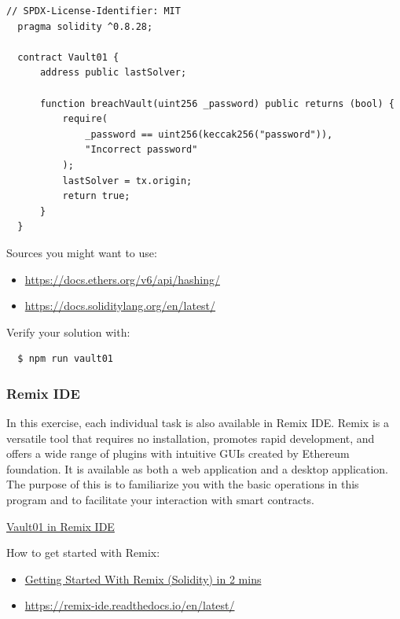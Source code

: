 \documentclass[12pt]{article}
\begin{document}
\begin{lstlisting}[language=Solidity]
  // SPDX-License-Identifier: MIT
  pragma solidity ^0.8.28;
  
  contract Vault01 {
      address public lastSolver;
  
      function breachVault(uint256 _password) public returns (bool) {
          require(
              _password == uint256(keccak256("password")),
              "Incorrect password"
          );
          lastSolver = tx.origin;
          return true;
      }
  }  
\end{lstlisting}

\medskip
\noindent
Sources you might want to use:
\begin{itemize}
  \item \href{https://docs.ethers.org/v6/api/hashing/}{https://docs.ethers.org/v6/api/hashing/}
  \item \href{https://docs.soliditylang.org/en/latest/}{https://docs.soliditylang.org/en/latest/}
\end{itemize}

\medskip
\noindent
Verify your solution with:
\begin{verbatim}
  $ npm run vault01
\end{verbatim}

\subsubsection*{Remix IDE}

In this exercise, each individual task is also available in Remix IDE. Remix is a versatile tool that requires no installation, promotes rapid development, and offers a wide range of plugins with intuitive GUIs created by Ethereum foundation. It is available as both a web application and a desktop application. The purpose of this is to familiarize you with the basic operations in this program and to facilitate your interaction with smart contracts.

\medskip
\noindent
\href{https://remix.ethereum.org/?#activate=solidity&url=https://github.com/radovluk/unbreakable-vault/contracts/Vault01.sol&lang=en&optimize=false&runs=200&evmVersion=null&version=soljson-v0.8.28+commit.7893614a.js}{Vault01 in Remix IDE}

\medskip
\noindent
How to get started with Remix:
\begin{itemize}
  \item \href{https://www.youtube.com/watch?v=vH8T3In6ZkE&t=7s&ab_channel=EatTheBlocks}{Getting Started With Remix (Solidity) in 2 mins}
  \item \href{https://remix-ide.readthedocs.io/en/latest/}{https://remix-ide.readthedocs.io/en/latest/}
\end{itemize}
\end{document}
